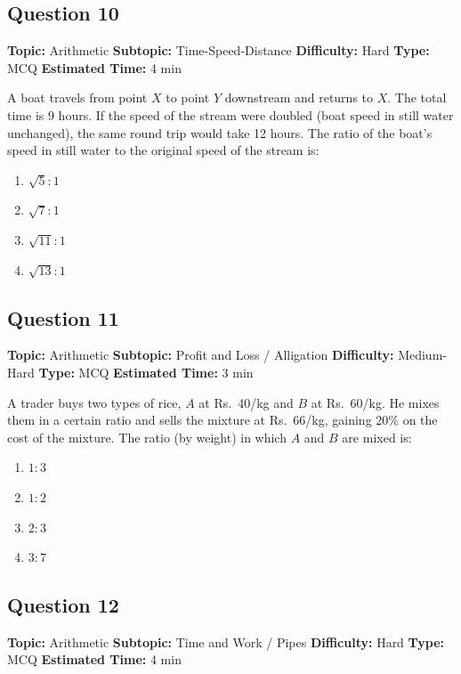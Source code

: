 \documentclass[11pt]{article}
\begin{document}
\subsection*{Question 10}
\textbf{Topic:} Arithmetic \quad \textbf{Subtopic:} Time-Speed-Distance \quad \textbf{Difficulty:} Hard \quad \textbf{Type:} MCQ \quad \textbf{Estimated Time:} 4 min

\begin{tcolorbox}
A boat travels from point $X$ to point $Y$ downstream and returns to $X$. The total time is 9 hours. If the speed of the stream were doubled (boat speed in still water unchanged), the same round trip would take 12 hours. The ratio of the boat's speed in still water to the original speed of the stream is:
\end{tcolorbox}
\begin{enumerate}[label=(\Alph*)]
\item $\sqrt{5}:1$
\item $\sqrt{7}:1$
\item $\sqrt{11}:1$
\item $\sqrt{13}:1$
\end{enumerate}

\subsection*{Question 11}
\textbf{Topic:} Arithmetic \quad \textbf{Subtopic:} Profit and Loss / Alligation \quad \textbf{Difficulty:} Medium-Hard \quad \textbf{Type:} MCQ \quad \textbf{Estimated Time:} 3 min

\begin{tcolorbox}
A trader buys two types of rice, $A$ at Rs.\ 40/kg and $B$ at Rs.\ 60/kg. He mixes them in a certain ratio and sells the mixture at Rs.\ 66/kg, gaining 20\% on the cost of the mixture. The ratio (by weight) in which $A$ and $B$ are mixed is:
\end{tcolorbox}
\begin{enumerate}[label=(\Alph*)]
\item $1:3$
\item $1:2$
\item $2:3$
\item $3:7$
\end{enumerate}

\subsection*{Question 12}
\textbf{Topic:} Arithmetic \quad \textbf{Subtopic:} Time and Work / Pipes \quad \textbf{Difficulty:} Hard \quad \textbf{Type:} MCQ \quad \textbf{Estimated Time:} 4 min
\end{document}
